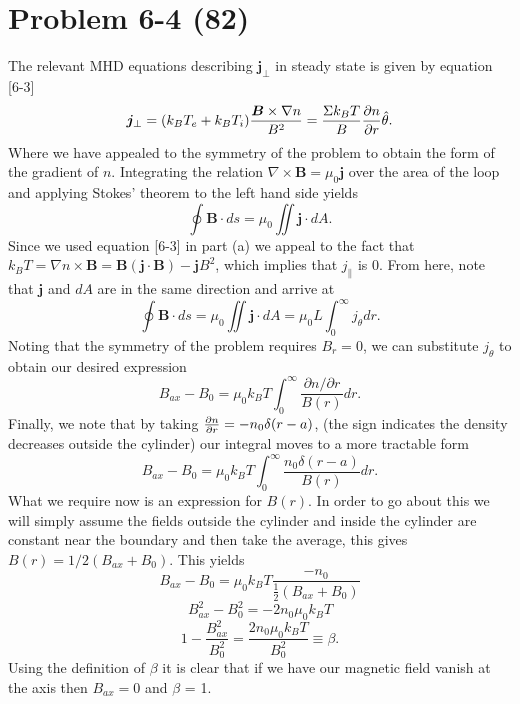 \section*{Problem 6-4 (82)}
\label{sec:6-4}
The relevant MHD equations describing \(\bm{j}_\perp \) in steady state is given by equation [6-3]
\begin{equation*}
	\bm{j}_\perp = (k_BT_e + k_BT_i)\dfrac{\bm{B}\times \nabla n}{B^2} = \dfrac{\Sigma k_BT}{B}\frac{\partial n}{\partial r}\hat{\theta}.
\end{equation*}
Where we have appealed to the symmetry of the problem to obtain the form of the gradient of \(n\). Integrating the relation \(\nabla \times \bm{B} = \mu_0 \bm{j} \) over the area of the loop and applying Stokes' theorem to the left hand side yields
\begin{equation*}
	\oint \bm{B} \cdot ds = \mu_0 \iint \bm{j} \cdot dA.
\end{equation*}
Since we used equation [6-3] in part (a) we appeal to the fact that \(k_BT = \nabla n \times \bm{B} = \bm{B}\left(\bm{j}\cdot\bm{B} \right) - \bm{j}B^2 \), which implies that \(j_\parallel \) is 0. From here, note that \(\bm{j}\) and \(dA\) are in the same direction and arrive at
\begin{equation*}
	\oint \bm{B} \cdot ds = \mu_0 \iint \bm{j} \cdot dA = \mu_0 L \int_0^\infty j_\theta dr.
\end{equation*}
Noting that the symmetry of the problem requires \(B_r = 0\), we can substitute \(j_\theta \) to obtain our desired expression
\begin{equation*}
	B_{ax} - B_0 = \mu_0 k_BT\int_0^\infty \dfrac{\partial n / \partial r}{B(r)}dr.
\end{equation*}
Finally, we note that by taking \(\frac{\partial n}{\partial r} = -n_0\delta(r-a) \), (the sign indicates the density decreases outside the cylinder) our integral moves to a more tractable form
\begin{equation*}
	B_{ax} - B_0 = \mu_0 k_BT\int_0^\infty \dfrac{n_0\delta(r-a)}{B(r)}dr.
\end{equation*}
What we require now is an expression for \(B(r)\). In order to go about this we will simply assume the fields outside the cylinder and inside the cylinder are constant near the boundary and then take the average, this gives \(B(r) = 1/2(B_{ax} + B_0) \). This yields
\begin{equation*}
	B_{ax} - B_0 = \mu_0 k_BT\dfrac{-n_0}{\frac{1}{2}(B_{ax} + B_0)}
\end{equation*}
\begin{equation*}
	B_{ax}^2 - B_0^2 = -2n_0\mu_0 k_BT
\end{equation*}
\begin{equation*}
	1 - \dfrac{B_{ax}^2}{B_0^2} = \dfrac{2n_0\mu_0 k_BT}{B_0^2} \equiv \beta.
\end{equation*}
Using the definition of \(\beta \) it is clear that if we have our magnetic field vanish at the axis then \(B_{ax} = 0 \) and \(\beta\) = 1.

